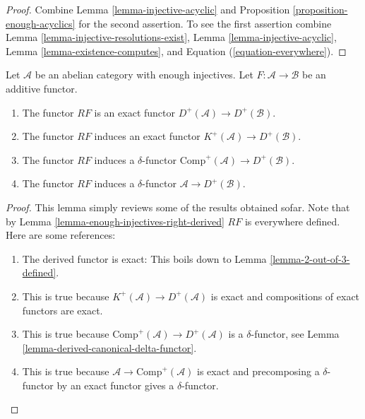 \begin{proof}
Combine
Lemma \ref{lemma-injective-acyclic}
and
Proposition \ref{proposition-enough-acyclics}
for the second assertion. To see the first assertion combine
Lemma \ref{lemma-injective-resolutions-exist},
Lemma \ref{lemma-injective-acyclic},
Lemma \ref{lemma-existence-computes},
and Equation (\ref{equation-everywhere}).
\end{proof}

\begin{lemma}
\label{lemma-right-derived-properties}
Let $\mathcal{A}$ be an abelian category with enough injectives.
Let $F : \mathcal{A} \to \mathcal{B}$ be an additive functor.
\begin{enumerate}
\item The functor $RF$ is an exact functor
$D^{+}(\mathcal{A}) \to D^{+}(\mathcal{B})$.
\item The functor $RF$ induces an exact functor
$K^{+}(\mathcal{A}) \to D^{+}(\mathcal{B})$.
\item The functor $RF$ induces a $\delta$-functor
$\text{Comp}^{+}(\mathcal{A}) \to D^{+}(\mathcal{B})$.
\item The functor $RF$ induces a $\delta$-functor
$\mathcal{A} \to D^{+}(\mathcal{B})$.
\end{enumerate}
\end{lemma}

\begin{proof}
This lemma simply reviews some of the results obtained sofar.
Note that by
Lemma \ref{lemma-enough-injectives-right-derived}
$RF$ is everywhere defined. Here are some references:
\begin{enumerate}
\item The derived functor is exact: This boils down to
Lemma \ref{lemma-2-out-of-3-defined}.
\item This is true because $K^{+}(\mathcal{A}) \to D^{+}(\mathcal{A})$
is exact and compositions of exact functors are exact.
\item This is true because
$\text{Comp}^{+}(\mathcal{A}) \to D^{+}(\mathcal{A})$ is
a $\delta$-functor, see
Lemma \ref{lemma-derived-canonical-delta-functor}.
\item This is true because $\mathcal{A} \to \text{Comp}^{+}(\mathcal{A})$
is exact and precomposing a $\delta$-functor by an exact functor gives
a $\delta$-functor.
\end{enumerate}
\end{proof}

